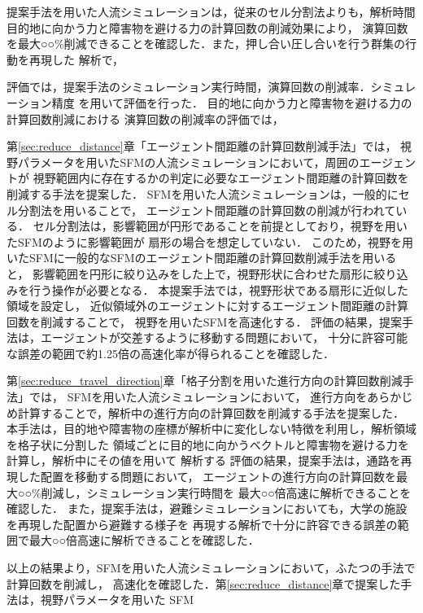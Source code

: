 
\clearpage
提案手法を用いた人流シミュレーションは，従来のセル分割法よりも，解析時間
目的地に向かう力と障害物を避ける力の計算回数の削減効果により，
演算回数を最大○○\%削減できることを確認した．また，押し合い圧し合いを行う群集の行動を再現した
解析で，


評価では，提案手法のシミュレーション実行時間，演算回数の削減率．シミュレーション精度
を用いて評価を行った．
目的地に向かう力と障害物を避ける力の計算回数削減における
演算回数の削減率の評価では，




第\ref{sec:reduce_distance}章「エージェント間距離の計算回数削減手法」では，
視野パラメータを用いたSFMの人流シミュレーションにおいて，周囲のエージェントが
視野範囲内に存在するかの判定に必要なエージェント間距離の計算回数を削減する手法を提案した．
SFMを用いた人流シミュレーションは，一般的にセル分割法を用いることで，
エージェント間距離の計算回数の削減が行われている．
セル分割法は，影響範囲が円形であることを前提としており，視野を用いたSFMのように影響範囲が
扇形の場合を想定していない．
このため，視野を用いたSFMに一般的なSFMのエージェント間距離の計算回数削減手法を用いると，
影響範囲を円形に絞り込みをした上で，視野形状に合わせた扇形に絞り込みを行う操作が必要となる．
本提案手法では，視野形状である扇形に近似した領域を設定し，
近似領域外のエージェントに対するエージェント間距離の計算回数を削減することで，
視野を用いたSFMを高速化する．
評価の結果，提案手法は，エージェントが交差するように移動する問題において，
十分に許容可能な誤差の範囲で約1.25倍の高速化率が得られることを確認した．


第\ref{sec:reduce_travel_direction}章「格子分割を用いた進行方向の計算回数削減手法」では，
SFMを用いた人流シミュレーションにおいて，
進行方向をあらかじめ計算することで，解析中の進行方向の計算回数を削減する手法を提案した．
本手法は，目的地や障害物の座標が解析中に変化しない特徴を利用し，解析領域を格子状に分割した
領域ごとに目的地に向かうベクトルと障害物を避ける力を計算し，解析中にその値を用いて
解析する
評価の結果，提案手法は，通路を再現した配置を移動する問題において，
エージェントの進行方向の計算回数を最大○○\%削減し，シミュレーション実行時間を
最大○○倍高速に解析できることを確認した．
また，提案手法は，避難シミュレーションにおいても，大学の施設を再現した配置から避難する様子を
再現する解析で十分に許容できる誤差の範囲で最大○○倍高速に解析できることを確認した．

以上の結果より，SFMを用いた人流シミュレーションにおいて，ふたつの手法で計算回数を削減し，
高速化を確認した．第\ref{sec:reduce_distance}章で提案した手法は，視野パラメータを用いた
SFM

